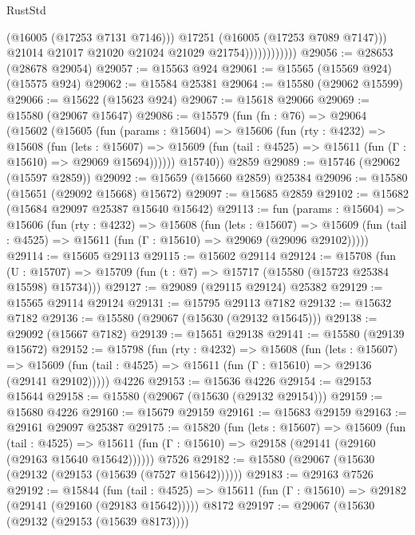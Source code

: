 \begin{lexlean}{RustStd}
\begin{coremodule}
                                (@16005 (@17253 @7131 @7146)))
                              @17251
                              (@16005 (@17253 @7089 @7147)))
                            @21014
                            @21017
                            @21020
                            @21024
                            @21029
                            @21754))))))))))))
@29056 := @28653 (@28678 @29054)
@29057 := @15563 @924
@29061 := @15565 (@15569 @924) (@15575 @924)
@29062 := @15584 @25381
@29064 := @15580 (@29062 @15599)
@29066 := @15622 (@15623 @924)
@29067 := @15618 @29066
@29069 := @15580 (@29067 @15647)
@29086 := @15579
    (fun (fn : @76) =>
    @29064
      (@15602
        (@15605
          (fun (params : @15604) =>
          @15606
            (fun (rty : @4232) =>
            @15608
              (fun (lets : @15607) =>
              @15609 (fun (tail : @4525) => @15611 (fun (Γ : @15610) => @29069 @15694))))))
        @15740))
    @2859
@29089 := @15746 (@29062 (@15597 @2859))
@29092 := @15659 (@15660 @2859) @25384
@29096 := @15580 (@15651 (@29092 @15668) @15672)
@29097 := @15685 @2859
@29102 := @15682 (@15684 @29097 @25387 @15640 @15642)
@29113 := fun (params : @15604) =>
  @15606
    (fun (rty : @4232) =>
    @15608
      (fun (lets : @15607) =>
      @15609 (fun (tail : @4525) => @15611 (fun (Γ : @15610) => @29069 (@29096 @29102)))))
@29114 := @15605 @29113
@29115 := @15602 @29114
@29124 := @15708
    (fun (U : @15707) => @15709 (fun (t : @7) => @15717 (@15580 (@15723 @25384 @15598) @15734)))
@29127 := @29089 (@29115 @29124) @25382
@29129 := @15565 @29114 @29124
@29131 := @15795 @29113 @7182
@29132 := @15632 @7182
@29136 := @15580 (@29067 (@15630 (@29132 @15645)))
@29138 := @29092 (@15667 @7182)
@29139 := @15651 @29138
@29141 := @15580 (@29139 @15672)
@29152 := @15798
    (fun (rty : @4232) =>
    @15608
      (fun (lets : @15607) =>
      @15609 (fun (tail : @4525) => @15611 (fun (Γ : @15610) => @29136 (@29141 @29102)))))
    @4226
@29153 := @15636 @4226
@29154 := @29153 @15644
@29158 := @15580 (@29067 (@15630 (@29132 @29154)))
@29159 := @15680 @4226
@29160 := @15679 @29159
@29161 := @15683 @29159
@29163 := @29161 @29097 @25387
@29175 := @15820
    (fun (lets : @15607) =>
    @15609
      (fun (tail : @4525) =>
      @15611 (fun (Γ : @15610) => @29158 (@29141 (@29160 (@29163 @15640 @15642))))))
    @7526
@29182 := @15580 (@29067 (@15630 (@29132 (@29153 (@15639 (@7527 @15642))))))
@29183 := @29163 @7526
@29192 := @15844
    (fun (tail : @4525) => @15611 (fun (Γ : @15610) => @29182 (@29141 (@29160 (@29183 @15642)))))
    @8172
@29197 := @29067 (@15630 (@29132 (@29153 (@15639 @8173))))

\end{coremodule}
\end{lexlean}
